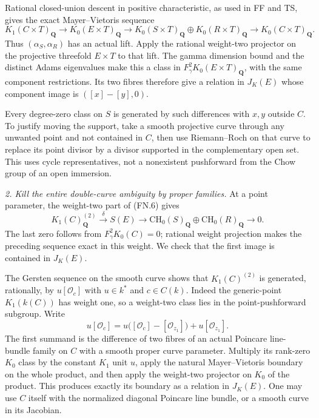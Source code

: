 Rational closed-union descent in positive characteristic, as
used in FF and TS, gives the exact Mayer--Vietoris sequence
\begin{equation}
 K_1(C\times T)_{\mathbf Q}\longrightarrow K_0(E\times T)_{\mathbf Q}
 \longrightarrow K_0(S\times T)_{\mathbf Q}\oplus
                   K_0(R\times T)_{\mathbf Q}
 \longrightarrow K_0(C\times T)_{\mathbf Q}.          \tag{FN.6}
\end{equation}
Thus $(\alpha_S,\alpha_R)$ has an actual lift. Apply the
rational weight-two projector on the projective threefold
$E\times T$ to that lift. The gamma dimension bound and the
distinct Adams eigenvalues make this a class in
$F_\gamma^2K_0(E\times T)_{\mathbf Q}$, with the same component
restrictions. Its two fibres therefore give a relation in
$J_K(E)$ whose component image is $([x]-[y],0)$.

Every degree-zero class on $S$ is generated by such differences
with $x,y$ outside $C$. To justify moving the support, take a
smooth projective curve through any unwanted point and not
contained in $C$, then use Riemann--Roch on that curve to replace
its point divisor by a divisor supported in the complementary
open set. This uses cycle representatives, not a nonexistent
pushforward from the Chow group of an open immersion.

\emph{2. Kill the entire double-curve ambiguity by proper families.}
At a point parameter, the weight-two part of (FN.6) gives
\begin{equation}
 K_1(C)_{\mathbf Q}^{(2)}\xrightarrow{\delta}S(E)
 \longrightarrow\mathrm{CH}_0(S)_{\mathbf Q}\oplus
                    \mathrm{CH}_0(R)_{\mathbf Q}
 \longrightarrow0.                                  \tag{FN.7}
\end{equation}
The last zero follows from $F_\gamma^2K_0(C)=0$; rational
weight projection makes the preceding sequence exact in this
weight. We check that the first image is contained in $J_K(E)$.

The Gersten sequence on the smooth curve shows that
$K_1(C)^{(2)}$ is generated, rationally, by
$u[\mathcal O_c]$ with $u\in k^*$ and $c\in C(k)$.
Indeed the generic-point $K_1(k(C))$ has weight one, so a
weight-two class lies in the point-pushforward subgroup.
Write
\[
 u[\mathcal O_c]
   =u\bigl([\mathcal O_c]-[\mathcal O_{z_1}]\bigr)
                         +u[\mathcal O_{z_1}].
\]
The first summand is the difference of two fibres of an actual
Poincare line-bundle family on $C$ with a smooth proper curve
parameter. Multiply its rank-zero $K_0$ class by the constant
$K_1$ unit $u$, apply the natural Mayer--Vietoris boundary on
the whole product, and then apply the weight-two projector on
$K_0$ of the product. This produces exactly its boundary as a
relation in $J_K(E)$. One may use $C$ itself with the normalized
diagonal Poincare line bundle, or a smooth curve in its Jacobian.

